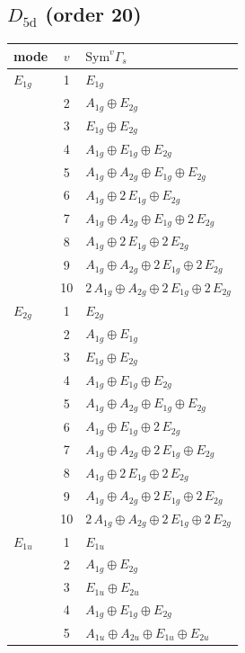 \documentclass[11pt]{article}
\begin{document}
\subsection*{$D_{5\mathrm{d}}$ \quad (order 20)}
\begin{longtable}{l c p{}}
\hline mode & $v$ & $\mathrm{Sym}^v\Gamma_s$\\ \hline\endhead
$E_{1g}$ & 1 & $E_{1g}$\\
 & 2 & $A_{1g}\oplus E_{2g}$\\
 & 3 & $E_{1g}\oplus E_{2g}$\\
 & 4 & $A_{1g}\oplus E_{1g}\oplus E_{2g}$\\
 & 5 & $A_{1g}\oplus A_{2g}\oplus E_{1g}\oplus E_{2g}$\\
 & 6 & $A_{1g}\oplus 2\,E_{1g}\oplus E_{2g}$\\
 & 7 & $A_{1g}\oplus A_{2g}\oplus E_{1g}\oplus 2\,E_{2g}$\\
 & 8 & $A_{1g}\oplus 2\,E_{1g}\oplus 2\,E_{2g}$\\
 & 9 & $A_{1g}\oplus A_{2g}\oplus 2\,E_{1g}\oplus 2\,E_{2g}$\\
 & 10 & $2\,A_{1g}\oplus A_{2g}\oplus 2\,E_{1g}\oplus 2\,E_{2g}$\\
\hline
$E_{2g}$ & 1 & $E_{2g}$\\
 & 2 & $A_{1g}\oplus E_{1g}$\\
 & 3 & $E_{1g}\oplus E_{2g}$\\
 & 4 & $A_{1g}\oplus E_{1g}\oplus E_{2g}$\\
 & 5 & $A_{1g}\oplus A_{2g}\oplus E_{1g}\oplus E_{2g}$\\
 & 6 & $A_{1g}\oplus E_{1g}\oplus 2\,E_{2g}$\\
 & 7 & $A_{1g}\oplus A_{2g}\oplus 2\,E_{1g}\oplus E_{2g}$\\
 & 8 & $A_{1g}\oplus 2\,E_{1g}\oplus 2\,E_{2g}$\\
 & 9 & $A_{1g}\oplus A_{2g}\oplus 2\,E_{1g}\oplus 2\,E_{2g}$\\
 & 10 & $2\,A_{1g}\oplus A_{2g}\oplus 2\,E_{1g}\oplus 2\,E_{2g}$\\
\hline
$E_{1u}$ & 1 & $E_{1u}$\\
 & 2 & $A_{1g}\oplus E_{2g}$\\
 & 3 & $E_{1u}\oplus E_{2u}$\\
 & 4 & $A_{1g}\oplus E_{1g}\oplus E_{2g}$\\
 & 5 & $A_{1u}\oplus A_{2u}\oplus E_{1u}\oplus E_{2u}$\\

\end{longtable}
\end{document}
